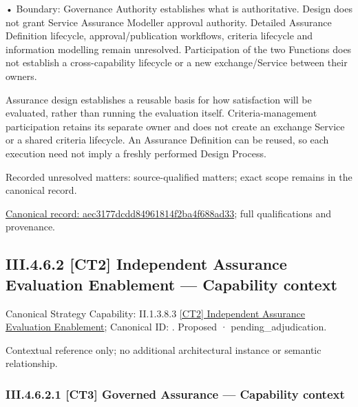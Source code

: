 •
Boundary: Governance Authority establishes what is authoritative. Design does not grant Service Assurance Modeller approval authority. Detailed Assurance Definition lifecycle, approval/publication workflows, criteria lifecycle and information modelling remain unresolved. Participation of the two Functions does not establish a cross-capability lifecycle or a new exchange/Service between their owners.



Assurance design establishes a reusable basis for how satisfaction will be evaluated, rather than running the evaluation itself. Criteria-management participation retains its separate owner and does not create an exchange Service or a shared criteria lifecycle. An Assurance Definition can be reused, so each execution need not imply a freshly performed Design Process.


{\small Recorded unresolved matters: source-qualified matters; exact scope remains in the canonical record.}\par
{\footnotesize \href{../../../../continuum/business/business-process/aec3177dcdd84961814f2ba4f688ad33.md}{Canonical record: aec3177dcdd84961814f2ba4f688ad33}; full qualifications and provenance.}\par
\subsection*{III.4.6.2 [CT2] Independent Assurance Evaluation Enablement — Capability context}
\label{navigation:III.4.6.2}

{\small Canonical Strategy Capability: II.1.3.8.3 \hyperref[element:7fa5112efb724b90a17a03c7c19c516a]{[CT2] Independent Assurance Evaluation Enablement}; Canonical ID: \texttt{}. Proposed · pending\_adjudication.}\par
Contextual reference only; no additional architectural instance or semantic relationship.\par
\subsubsection*{III.4.6.2.1 [CT3] Governed Assurance — Capability context}
\label{navigation:III.4.6.2.1}

